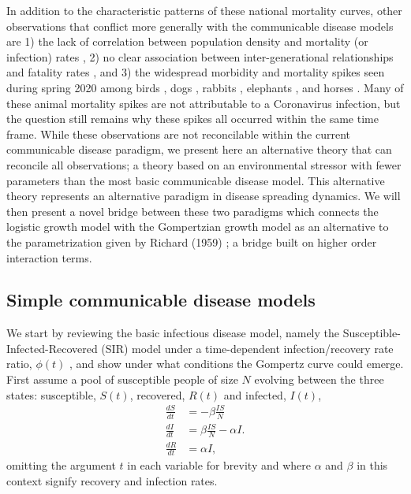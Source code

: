\documentclass[sn-mathphys]{sn-jnl}%
\theoremstyle{thmstyleone}%
\theoremstyle{thmstyletwo}%
\theoremstyle{thmstylethree}%
\begin{document}
In addition to the characteristic patterns of these national mortality curves, other observations that conflict more generally with the communicable disease models are 1) the lack of correlation between population density and mortality (or infection) rates \cite{Hamidi2020,Hamidi2020a,Carozzi2020,khavarian2021high,barak2021urban}, 2) no clear association between inter-generational relationships and fatality rates \cite{Arpino2020}, and 3) the widespread morbidity and mortality spikes seen during spring 2020 among birds \cite{Fischer2021}, dogs \cite{PeriseBarrios2021}, rabbits \cite{Duff2020,Hu2020,Fukui2021}, elephants \cite{Aarde2021}, and horses \cite{Kambayashi2021,King2020,Lu2020,CastilloOlivares2020}. Many of these animal mortality spikes are not attributable to a Coronavirus infection, but the question still remains why these spikes all occurred within the same time frame. While these observations are not reconcilable within the current communicable disease paradigm, we present here an alternative theory that can reconcile all observations; a theory based on an environmental stressor with fewer parameters than the most basic communicable disease model. This alternative theory represents an alternative paradigm in disease spreading dynamics. We will then present a novel bridge between these two paradigms which connects the logistic growth model with the Gompertzian growth model as an alternative to the parametrization given by Richard (1959) \cite{richards1959flexible}; a bridge built on higher order interaction terms. 

\subsection*{Simple communicable disease models}
We start by reviewing the basic infectious disease model, namely the Susceptible-Infected-Recovered (SIR) model under a time-dependent infection/recovery rate ratio, $\phi(t)$ \cite{kermack1927contribution}, and show under what conditions the Gompertz curve could emerge. First assume a pool of susceptible people of size $N$ evolving between the three states: susceptible, $S(t)$, recovered, $R(t)$ and infected, $I(t)$,
\begin{align}
\label{eq:SIR}
\frac{dS}{dt}& = -\beta \frac{IS}{N}\nonumber\\
\frac{dI}{dt}& = \beta \frac{IS}{N} - \alpha I.\\
\frac{dR}{dt}& = \alpha I\nonumber,
\end{align}
omitting the argument $t$ in each variable for brevity and where $\alpha$ and $\beta$ in this context signify recovery and infection rates.
\end{document}

